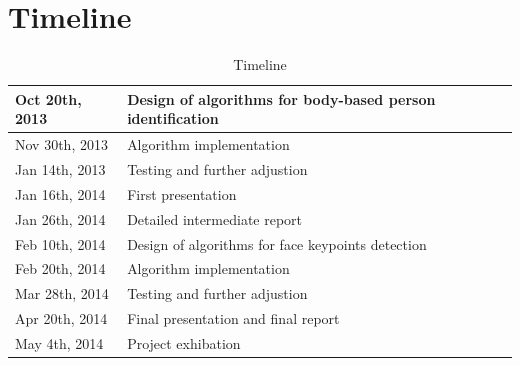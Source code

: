 \documentclass[pdftex,12pt,a4paper]{report}
\begin{document}
\section{Timeline}
\begin{table}[t]
    \begin{tabular}{|l|l|}
    \hline
    Oct 20th, 2013 & Design of algorithms for body-based person identification \\ \hline
    Nov 30th, 2013 & Algorithm implementation \\ \hline
    Jan 14th, 2013 & Testing and further adjustion \\ \hline
    Jan 16th, 2014 & First presentation  \\ \hline
    Jan 26th, 2014 & Detailed intermediate report \\ \hline
    Feb 10th, 2014 & Design of algorithms for face keypoints detection \\ \hline
    Feb 20th, 2014 & Algorithm implementation \\ \hline
    Mar 28th, 2014 & Testing and further adjustion \\ \hline 
    Apr 20th, 2014 & Final presentation and final report \\  \hline
    May 4th, 2014 & Project exhibation \\ \hline
    \end{tabular} 
    \caption{Timeline}
\end{table}








\cleardoublepage
{}
{}


\end{document}
